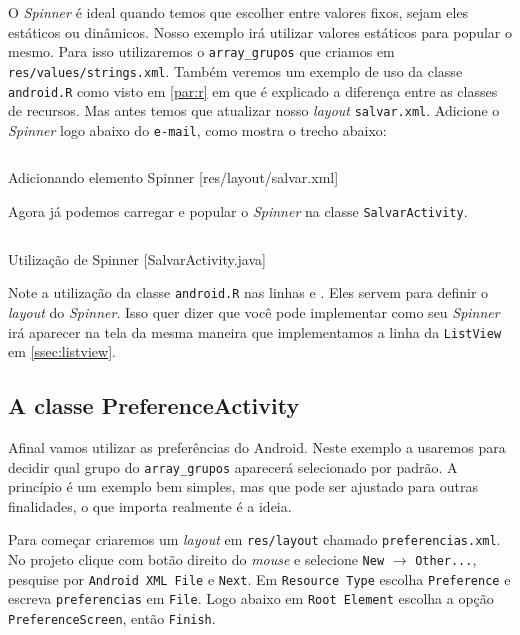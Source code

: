 O \emph{Spinner} é ideal quando temos que escolher entre valores fixos,
sejam eles estáticos ou dinâmicos. Nosso exemplo irá utilizar valores
estáticos para popular o mesmo. Para isso utilizaremos o
\texttt{array\_grupos} que criamos em \texttt{res/values/strings.xml}.
Também veremos um exemplo de uso da classe \texttt{android.R} como visto
em \ref{par:r} em que é explicado a diferença entre as classes de
recursos. Mas antes temos que atualizar nosso \emph{layout}
\texttt{salvar.xml}. Adicione o \emph{Spinner} logo abaixo do
\texttt{e-mail}, como mostra o trecho abaixo:

\begin{listing}[H]
  \inputminted[linenos=true,frame=bottomline,tabsize=3]{ xml }{ source/salvar-3.xml }
  \caption{Adicionando elemento Spinner [res/layout/salvar.xml]}
\end{listing}

Agora já podemos carregar e popular o \emph{Spinner} na classe
\texttt{SalvarActivity}.

\begin{listing}[H]
  \inputminted[linenos=true,frame=bottomline,tabsize=3]{ java }{ source/SalvarActivity-6.java }
  \caption{Utilização de Spinner [SalvarActivity.java]}
\end{listing}

Note a utilização da classe \texttt{android.R} nas linhas  e
. Eles servem para definir o \emph{layout} do
\emph{Spinner}. Isso quer dizer que você pode implementar como seu
\emph{Spinner} irá aparecer na tela da mesma maneira que implementamos a
linha da \texttt{ListView} em \ref{ssec:listview}.

\subsection{A classe PreferenceActivity}

Afinal vamos utilizar as preferências do Android. Neste exemplo a
usaremos para decidir qual grupo do \texttt{array\_grupos} aparecerá
selecionado por padrão. A princípio é um exemplo bem simples, mas que
pode ser ajustado para outras finalidades, o que importa realmente é a
ideia.

Para começar criaremos um \emph{layout} em \texttt{res/layout} chamado
\texttt{preferencias.xml}. No projeto clique com botão direito do
\emph{mouse} e selecione \texttt{New} $\rightarrow$ \texttt{Other...},
pesquise por \texttt{Android XML File} e \texttt{Next}. Em
\texttt{Resource Type} escolha \texttt{Preference} e escreva
\texttt{preferencias} em \texttt{File}. Logo abaixo em
\texttt{Root Element} escolha a opção \texttt{PreferenceScreen}, então
\texttt{Finish}.

